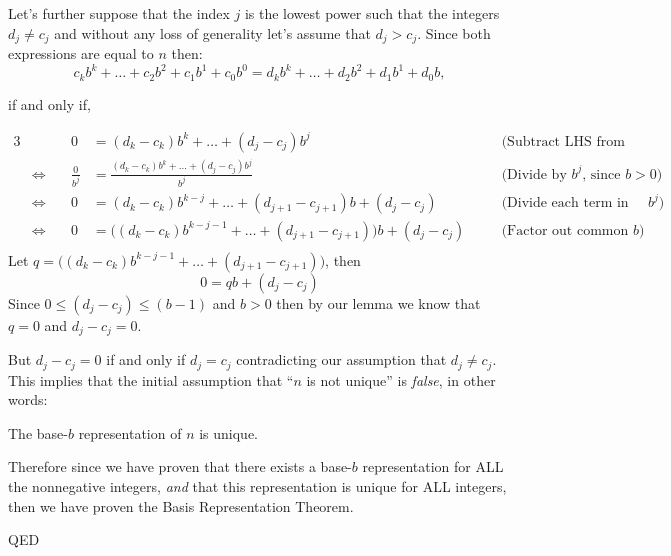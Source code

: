\documentclass{article}
\begin{document}
Let's further suppose that the index $j$ is the lowest power such that the integers $d_j\ne{}c_j$ and without any loss of generality
let's assume that $d_j>c_j$. Since both expressions are equal to $n$ then:
\[c_kb^k+\dots+c_2b^2+c_1b^1+c_0b^0=d_kb^k+\dots+d_2b^2+d_1b^1+d_0b,\]
\begin{center}
if and only if,
\end{center}
\begin{alignat*}{3}
  &&0
  &= (d_k-c_k)b^k+\dots+(d_j-c_j)b^j&&\quad\text{(Subtract LHS from both sides)}\\
  &\Leftrightarrow\quad
  &\frac{0}{b^j}
  &= \frac{(d_k-c_k)b^k+\dots+(d_j-c_j)b^j}{b^j} &&\quad\text{(Divide by }b^j\text{, since }b>0\text{)}\\
  &\Leftrightarrow\quad
  &0
  &=(d_k-c_k)b^{k-j}+\dots+(d_{j+1}-c_{j+1})b+(d_j-c_j) &&\quad\text{(Divide each term in numerator by }b^j{)}\\
  &\Leftrightarrow\quad
  &0
  &= \big((d_k-c_k)b^{k-j-1}+\dots+(d_{j+1}-c_{j+1})\big)b+(d_j-c_j) &&\quad\text{(Factor out common }b{)}\\
\end{alignat*}
%
Let $q=\big((d_k-c_k)b^{k-j-1}+\dots+(d_{j+1}-c_{j+1})\big)$, then
\[0=qb+(d_j-c_j)\]
Since $0\le(d_j-c_j)\le(b-1)$ and $b>0$ then by our lemma we know that\\
$q=0$ and $d_j-c_j = 0$.

But $d_j-c_j = 0$ if and only if $d_j = c_j$
contradicting our assumption that $d_j\ne{}c_j$. This implies that the initial assumption that ``$n$
is not unique'' is \emph{false}, in other words:
\begin{center}
The base-$b$ representation of $n$ is unique.
\end{center}

\bigskip
Therefore since we have proven that there exists a base-$b$
representation for ALL the nonnegative integers, \emph{and}
that this representation is unique for ALL integers, then we
have proven the Basis Representation Theorem.

QED
\end{document}
